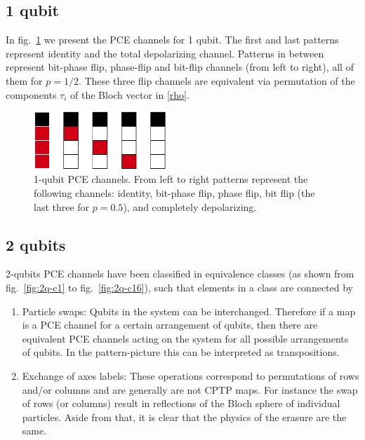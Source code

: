 \documentclass[11pt,dvipsnames]{article} %
\newcommand{\fref}[1]{fig.~\ref{#1}}  \newcommand{\tref}[1]{table~\ref{#1}}
\newcommand{\1}{\mathds{1}}
\begin{document}
\subsection*{1 qubit} %
In \fref{fig:1q-ccs} we present the PCE channels for 1 qubit.
The first and last patterns represent identity 
and the total depolarizing channel. 
Patterns in between represent 
bit-phase flip, phase-flip and bit-flip channels (from left to right), 
all of them for $p=1/2$.	
These three flip channels are equivalent via permutation
of the components $\tau_i$ of the Bloch vector in \eqref{rho}.
\begin{figure}[H]%
	\centering
	\includegraphics[width=5cm]
	{img/1q-CCs.png}
	\caption{
1-qubit PCE channels. From left to right patterns represent  
the following channels: identity,
bit-phase flip, phase flip, bit flip (the last three for 
$p=0.5$), and completely depolarizing.}
	\label{fig:1q-ccs}
\end{figure} %
\subsection*{2 qubits} %
2-qubits PCE channels have been classified in equivalence classes 
(as shown from \fref{fig:2q-c1} to \fref{fig:2q-c16}), such
that elements in a class are connected by
\begin{enumerate}
	\item Particle swaps: Qubits in the system can be interchanged. Therefore
	if a map is a PCE channel for a certain arrangement 
	of qubits, then
	there are equivalent PCE channels acting on the system for all possible
	arrangements of qubits. In the pattern-picture this can be
	interpreted as transpositions.
	\item Exchange of axes labels: These operations correspond to permutations of rows and/or columns and are generally are not CPTP maps. For instance the swap of rows (or columns) result in reflections of the Bloch sphere of individual particles. Aside from that, it is clear that the physics of the erasure are the same.
\end{enumerate}
\end{document}
